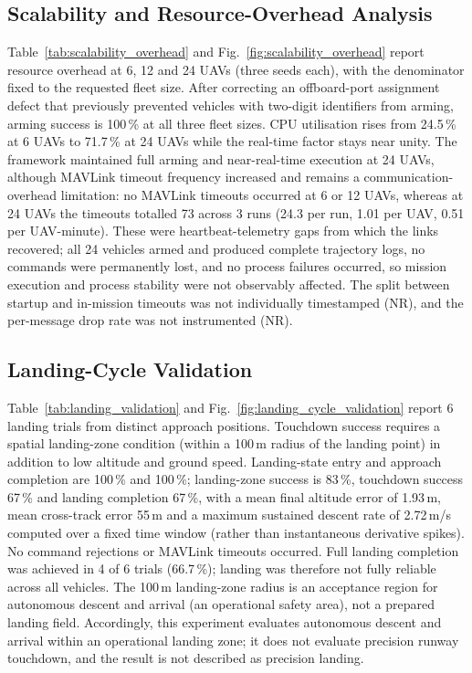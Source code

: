 \subsection{Scalability and Resource-Overhead Analysis}
Table~\ref{tab:scalability_overhead} and Fig.~\ref{fig:scalability_overhead} report resource overhead at 6, 12 and 24 UAVs (three seeds each), with the denominator fixed to the requested fleet size. After correcting an offboard-port assignment defect that previously prevented vehicles with two-digit identifiers from arming, arming success is 100\,\% at all three fleet sizes. CPU utilisation rises from 24.5\,\% at 6 UAVs to 71.7\,\% at 24 UAVs while the real-time factor stays near unity. The framework maintained full arming and near-real-time execution at 24 UAVs, although MAVLink timeout frequency increased and remains a communication-overhead limitation: no MAVLink timeouts occurred at 6 or 12 UAVs, whereas at 24 UAVs the timeouts totalled 73 across 3 runs (24.3 per run, 1.01 per UAV, 0.51 per UAV-minute). These were heartbeat-telemetry gaps from which the links recovered; all 24 vehicles armed and produced complete trajectory logs, no commands were permanently lost, and no process failures occurred, so mission execution and process stability were not observably affected. The split between startup and in-mission timeouts was not individually timestamped (NR), and the per-message drop rate was not instrumented (NR).

\subsection{Landing-Cycle Validation}
Table~\ref{tab:landing_validation} and Fig.~\ref{fig:landing_cycle_validation} report 6 landing trials from distinct approach positions. Touchdown success requires a spatial landing-zone condition (within a 100\,m radius of the landing point) in addition to low altitude and ground speed. Landing-state entry and approach completion are 100\,\% and 100\,\%; landing-zone success is 83\,\%, touchdown success 67\,\% and landing completion 67\,\%, with a mean final altitude error of 1.93\,m, mean cross-track error 55\,m and a maximum sustained descent rate of 2.72\,m/s computed over a fixed time window (rather than instantaneous derivative spikes). No command rejections or MAVLink timeouts occurred. Full landing completion was achieved in 4 of 6 trials (66.7\,\%); landing was therefore not fully reliable across all vehicles. The 100\,m landing-zone radius is an acceptance region for autonomous descent and arrival (an operational safety area), not a prepared landing field. Accordingly, this experiment evaluates autonomous descent and arrival within an operational landing zone; it does not evaluate precision runway touchdown, and the result is not described as precision landing.

